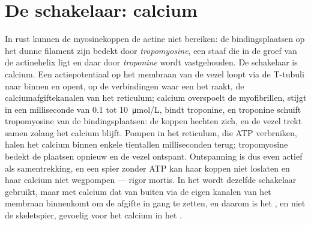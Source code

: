 \section{De schakelaar: calcium}

\begin{proposition}\label{prop:b2:muscle-movement:coupling}
In rust kunnen de myosinekoppen de actine niet bereiken: de bindingsplaatsen
op het dunne filament zijn bedekt door \emph{tropomyosine}, een staaf die in
de groef van de actinehelix ligt en daar door \emph{troponine} wordt
vastgehouden. De schakelaar is calcium. Een actiepotentiaal op het membraan
van de vezel loopt via de T-tubuli naar binnen en opent, op de verbindingen
waar een  het  raakt, de
calciumafgiftekanalen van het reticulum; calcium overspoelt de myofibrillen,
stijgt in een milliseconde van \qty{0.1}{} tot \qty{10}{\micro mol/L},
bindt troponine, en troponine schuift tropomyosine van de bindingsplaatsen:
de koppen hechten zich, en de vezel trekt samen zolang het calcium blijft.
Pompen in het reticulum, die ATP verbruiken, halen het calcium binnen enkele
tientallen milliseconden terug; tropomyosine bedekt de plaatsen opnieuw en de
vezel ontspant. Ontspanning is dus even actief als samentrekking, en een spier
zonder ATP kan haar koppen niet loslaten en haar calcium niet wegpompen ---
rigor mortis. In het  wordt dezelfde schakelaar gebruikt, maar met
calcium dat van buiten via de eigen kanalen van het membraan binnenkomt om de
afgifte in gang te zetten, en daarom is het , en niet de skeletspier,
gevoelig voor het calcium in het .
\end{proposition}

